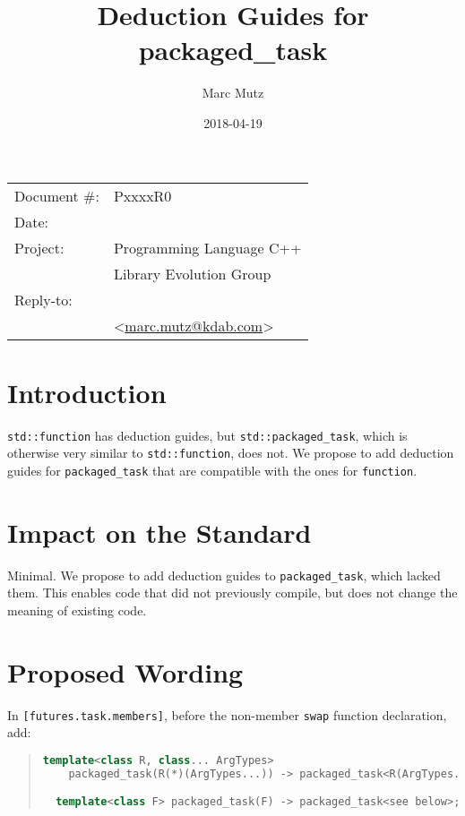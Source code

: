 \documentclass[11pt]{article}
\date{}
\title{Deduction Guides for packaged\_task}
\makeatletter
\newcommand{\emailaddress}{marc.mutz@kdab.com}
\newcommand{\email}{\href{mailto:\emailaddress}{\emailaddress}}
\makeatother
\begin{document}
\maketitle\vspace{-2cm}

\begin{flushright}
  \begin{tabular}{ll}
  Document \#:&PxxxxR0\\
  Date:       &\date{2018-04-19}\\
  Project:    &Programming Language C++\\
              &Library Evolution Group\\
  Reply-to:   &\author{Marc Mutz}\\
              &\textless\email\textgreater
  \end{tabular}
\end{flushright}

\section{Introduction}

\texttt{std::function} has deduction guides, but
\texttt{std::packaged\_task}, which is otherwise very similar to
\texttt{std::function}, does not. We propose to add deduction guides
for \texttt{packaged\_task} that are compatible with the ones for
\texttt{function}.

\section{Impact on the Standard}

Minimal. We propose to add deduction guides to
\texttt{packaged\_task}, which lacked them. This enables code that did
not previously compile, but does not change the meaning of existing code.

\section{Proposed Wording}

In \texttt{[futures.task.members]}, before the non-member
\texttt{swap} function declaration, add:

\begin{quote}
\begin{lstlisting}[language=C++]
  template<class R, class... ArgTypes>
    packaged_task(R(*)(ArgTypes...)) -> packaged_task<R(ArgTypes...)>;

  template<class F> packaged_task(F) -> packaged_task<see below>;
\end{lstlisting}
\end{quote}
\end{document}
